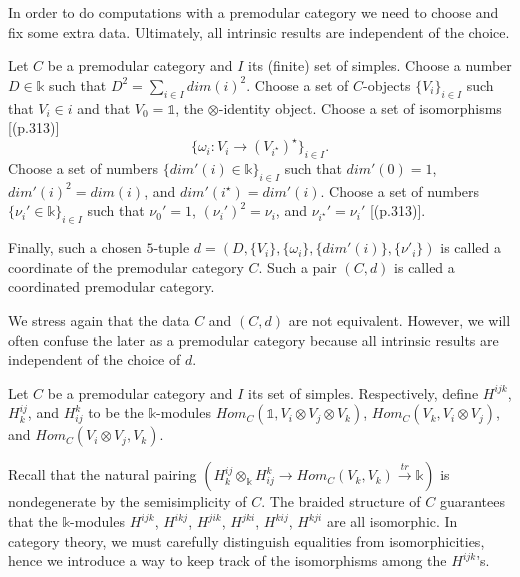 \noindent In order to do computations with a premodular category
we need to choose and fix some extra data. Ultimately, all
intrinsic results are independent of the choice.

\begin{definition}\label{def/coordinated-premodular-category}
  Let $C$ be a premodular category and $I$ its (finite) set of
  simples. Choose a number $D \in \mathbb{k}$ such that
  $D^{2} = \sum_{i \in I} dim(i)^{2}$. Choose a set of
  $C$-objects $\{V_{i}\}_{i \in I}$ such that $V_{i} \in i$ and
  that $V_{0} = \mathbb{1}$, the $\otimes$-identity object.
  Choose a set of isomorphisms [(p.313)]
  $$\{\omega_{i}: V_{i} \to (V_{i^{\star}})^{\star}\}_{i \in I}.$$
  Choose a set of numbers $\{dim'(i) \in \mathbb{k}\}_{i \in I}$
  such that $dim'(0) = 1$, $dim'(i)^{2} = dim(i)$, and
  $dim'(i^{\star}) = dim'(i)$. Choose a set of numbers
  $\{\nu_{i}' \in \mathbb{k}\}_{i \in I}$ such that
  $\nu_{0}' = 1$, $(\nu_{i}')^{2} = \nu_{i}$, and
  $\nu_{i^{\star}}' = \nu_{i}'$ [(p.313)].

  Finally, such a chosen $5$-tuple
  $d = (D, \{V_{i}\}, \{\omega_{i}\}, \{dim'(i)\}, \{\nu'_{i}\})$
  is called a coordinate of the premodular category $C$. Such a
  pair $(C,d)$ is called a coordinated premodular category.
\end{definition}

\noindent We stress again that the data $C$ and $(C,d)$ are not
equivalent. However, we will often confuse the later as a
premodular category because all intrinsic results are independent
of the choice of $d$.

\begin{definition}\label{def/multiplicity-module}
  Let $C$ be a premodular category and $I$ its set of simples.
  Respectively, define $H^{ijk}$, $H_{k}^{ij}$, and $H_{ij}^{k}$
  to be the $\mathbb{k}$-modules
  $Hom_{C}(\mathbb{1}, V_{i} \otimes V_{j} \otimes V_{k})$,
  $Hom_{C}(V_{k}, V_{i} \otimes V_{j})$, and
  $Hom_{C}(V_{i} \otimes V_{j}, V_{k})$.
\end{definition}


\noindent Recall that the natural pairing
$\left( H^{ij}_{k} \otimes_{\mathbb{k}} H_{ij}^{k} \to Hom_{C}(V_{k},V_{k}) \xrightarrow{tr} \mathbb{k} \right)$
is nondegenerate by the semisimplicity of $C$. The braided
structure of $C$ guarantees that the $\mathbb{k}$-modules
$H^{ijk}$, $H^{ikj}$, $H^{jik}$, $H^{jki}$, $H^{kij}$, $H^{kji}$
are all isomorphic. In category theory, we must carefully
distinguish equalities from isomorphicities, hence we introduce a
way to keep track of the isomorphisms among the $H^{ijk}$'s.

